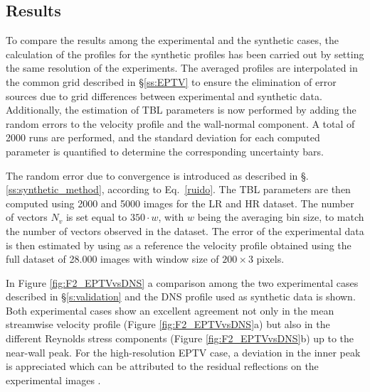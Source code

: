\subsection{Results}
\label{ss:expresults}

To compare the results among the experimental and the synthetic cases, the calculation of the profiles for the synthetic profiles has been carried out by setting the same resolution of the experiments. The averaged profiles are interpolated in the common grid described in \S\ref{ss:EPTV} to ensure the elimination of error sources due to grid differences between experimental and synthetic data.
Additionally, the estimation of TBL parameters is now performed by adding the random errors to the velocity profile and the {wall-normal} component. A total of 2000 runs are performed, and the standard deviation for each computed parameter is quantified to determine the corresponding uncertainty bars. 

The random error due to convergence is introduced as described in \S.\ref{ss:synthetic_method}, according to Eq.~\ref{ruido}. The TBL parameters are then computed using 2000 and 5000 images for the LR and HR dataset. The number of vectors $N_v$ is set equal to $350\cdot w$, with $w$ being the averaging bin size, to match the number of vectors observed in the dataset. The error of the experimental data is then estimated by using as a reference the velocity profile obtained using the full dataset of 28.000 images with window size of $200\times3$ pixels.

In Figure \ref{fig:F2_EPTVvsDNS} a comparison among the two experimental cases described in \S\ref{s:validation} and the DNS profile used as synthetic data is shown. Both experimental cases show an excellent agreement not only in the mean streamwise velocity profile (Figure \ref{fig:F2_EPTVvsDNS}a) but also in the different Reynolds stress components  (Figure \ref{fig:F2_EPTVvsDNS}b) up to the near-wall peak. For the high-resolution EPTV case, a deviation in the inner peak is appreciated which can be attributed to the residual reflections on the experimental images \citep{SanmiguelVila2017}. 

